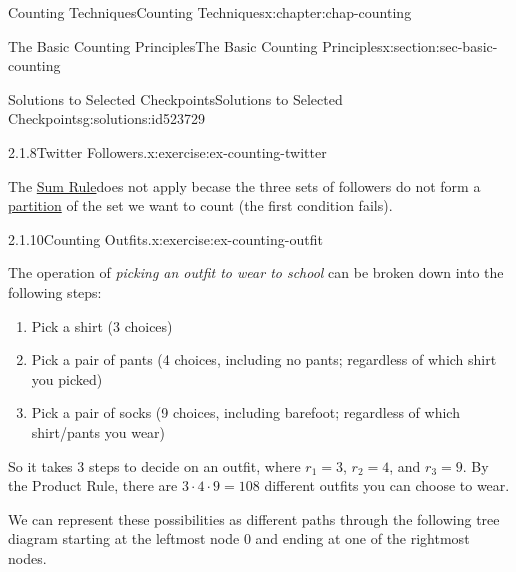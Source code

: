 \documentclass[oneside,10pt,]{book}
\numberwithin{equation}{section}
\begin{document}
\begin{chapterptx}{Counting Techniques}{}{Counting Techniques}{}{}{x:chapter:chap-counting}
\begin{sectionptx}{The Basic Counting Principles}{}{The Basic Counting Principles}{}{}{x:section:sec-basic-counting}
\begin{solutions-subsection-numberless}{Solutions to Selected Checkpoints}{}{Solutions to Selected Checkpoints}{}{}{g:solutions:id523729}
\begin{inlinesolution}{2.1.8}{Twitter Followers.}{x:exercise:ex-counting-twitter}
\par
The \hyperref[x:principle:prin-sum-rule]{Sum Rule}does not apply becase the three sets of followers do not form a \hyperref[x:definition:def-partition]{partition} of the set we want to count (the first condition fails).%
\end{inlinesolution}%
\begin{inlinesolution}{2.1.10}{Counting Outfits.}{x:exercise:ex-counting-outfit}%
\par\smallskip%
\noindent\hypertarget{g:solution:id523463-main}{}The operation of \emph{picking an outfit to wear to school} can be broken down into the following steps:%
\begin{enumerate}
\item{}Pick a shirt (3 choices)%
\item{}Pick a pair of pants (4 choices, including no pants; regardless of which shirt you picked)%
\item{}Pick a pair of socks (9 choices, including barefoot; regardless of which shirt\slash{}pants you wear)%
\end{enumerate}
So it takes 3 steps to decide on an outfit, where \(r_1 = 3\), \(r_2 = 4\), and \(r_3 = 9\). By the Product Rule, there are \(3 \cdot 4 \cdot 9 = 108\) different outfits you can choose to wear.%
\par
We can represent these possibilities as different paths through the following tree diagram starting at the leftmost node \(0\) and ending at one of the rightmost nodes.%
\begin{sidebyside}{1}{0.15}{0.15}{0}%
\begin{sbspanel}{0.7}%
\end{sbspanel}
\end{sidebyside}
\end{inlinesolution}
\end{solutions-subsection-numberless}
\end{sectionptx}
\end{chapterptx}
\end{document}
